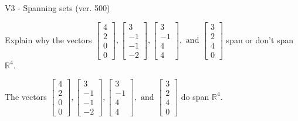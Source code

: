 \begin{exercise}
  \begin{exerciseTitle}V3 - Spanning sets (ver. 500)\end{exerciseTitle}
  \begin{exerciseStatement}
    Explain why the vectors \(\left[\begin{array}{r}
4 \\
2 \\
0 \\
0
\end{array}\right] , \left[\begin{array}{r}
3 \\
-1 \\
-1 \\
-2
\end{array}\right] , \left[\begin{array}{r}
3 \\
-1 \\
4 \\
4
\end{array}\right] , \text{ and } \left[\begin{array}{r}
3 \\
2 \\
4 \\
0
\end{array}\right]\) span or don't span \(\mathbb{R}^4\). 
	


  \end{exerciseStatement}
  \begin{exerciseAnswer}
   The vectors \(\left[\begin{array}{r}
4 \\
2 \\
0 \\
0
\end{array}\right] , \left[\begin{array}{r}
3 \\
-1 \\
-1 \\
-2
\end{array}\right] , \left[\begin{array}{r}
3 \\
-1 \\
4 \\
4
\end{array}\right] , \text{ and } \left[\begin{array}{r}
3 \\
2 \\
4 \\
0
\end{array}\right]\) 
  	 do  
	span \(\mathbb{R}^4\).
  


  \end{exerciseAnswer}
\end{exercise}
